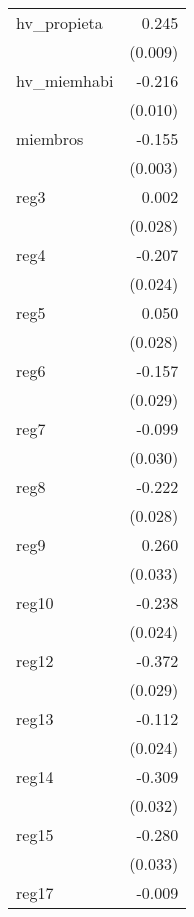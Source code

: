 {\begin{longtable}{l*{1}{D{.}{.}{-1}}}
\addlinespace
hv\_propieta &       0.245\sym{***}\\
            &     (0.009)         \\
\addlinespace
hv\_miemhabi &      -0.216\sym{***}\\
            &     (0.010)         \\
\addlinespace
miembros    &      -0.155\sym{***}\\
            &     (0.003)         \\
\addlinespace
reg3        &       0.002         \\
            &     (0.028)         \\
\addlinespace
reg4        &      -0.207\sym{***}\\
            &     (0.024)         \\
\addlinespace
reg5        &       0.050         \\
            &     (0.028)         \\
\addlinespace
reg6        &      -0.157\sym{***}\\
            &     (0.029)         \\
\addlinespace
reg7        &      -0.099\sym{***}\\
            &     (0.030)         \\
\addlinespace
reg8        &      -0.222\sym{***}\\
            &     (0.028)         \\
\addlinespace
reg9        &       0.260\sym{***}\\
            &     (0.033)         \\
\addlinespace
reg10       &      -0.238\sym{***}\\
            &     (0.024)         \\
\addlinespace
reg12       &      -0.372\sym{***}\\
            &     (0.029)         \\
\addlinespace
reg13       &      -0.112\sym{***}\\
            &     (0.024)         \\
\addlinespace
reg14       &      -0.309\sym{***}\\
            &     (0.032)         \\
\addlinespace
reg15       &      -0.280\sym{***}\\
            &     (0.033)         \\
\addlinespace
reg17       &      -0.009         \\

\end{longtable}}

